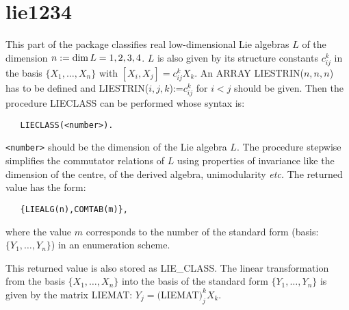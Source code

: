 \section{lie1234}

This part of the package classifies real low-dimensional Lie algebras $L$
of the dimension $n:={\rm dim}\,L=1,2,3,4$. $L$ is also given by its
structure constants $c_{ij}^k$ in the basis $\{X_1,\ldots,X_n\}$ with
$[X_i,X_j]=c_{ij}^k X_k$.  An ARRAY
LIESTRIN($n,n,n$) has to be defined and LIESTRIN($i,j,k$):=$c_{ij}^k$ for
$i<j$ should be given. Then the procedure LIECLASS can be performed
whose syntax is:
\begin{verbatim}
   LIECLASS(<number>).
\end{verbatim}
{\tt <number>} should be the dimension of the Lie algebra $L$.  The
procedure stepwise simplifies the commutator relations of $L$ using
properties of invariance like the dimension of the centre, of the
derived algebra, unimodularity {\em etc.}  The returned value has the form:
\begin{verbatim}
   {LIEALG(n),COMTAB(m)},
\end{verbatim}
where the value $m$ corresponds to the number of the standard form (basis:
$\{Y_1, \ldots ,Y_n\}$) in an enumeration scheme.

This returned value is also stored as LIE\_CLASS.  The linear
transformation from the basis $\{X_1,\ldots,X_n\}$ into the basis of
the standard form $\{Y_1,\ldots,Y_n\}$ is given by the matrix LIEMAT:
 $Y_j=($LIEMAT$)_j^k X_k$.

